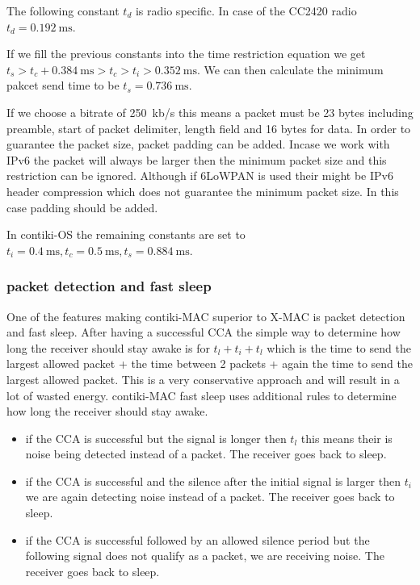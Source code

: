 The following constant $t_d$ is radio specific. In case of the CC2420 radio $t_d = 0.192~\text{ms}$.

If we fill the previous constants into the time restriction equation we get $t_s > t_c + 0.384~\text{ms} > t_c > t_i > 0.352~\text{ms}$. We can then calculate the minimum pakcet send time to be $t_s = 0.736~\text{ms}$.

If we choose a bitrate of 250~kb/s this means a packet must be 23 bytes including preamble, start of packet delimiter, length field and 16 bytes for data. In order to guarantee the packet size, packet padding can be added.
Incase we work with IPv6 the packet will always be larger then the minimum packet size and this restriction can be ignored. Although if 6LoWPAN is used their might be IPv6 header compression which does not guarantee the minimum packet size. In this case padding should be added.

In contiki-OS the remaining constants are set to $t_i = 0.4~\text{ms}, t_c = 0.5~\text{ms}, t_s = 0.884~\text{ms}$.

\subsubsection{packet detection and fast sleep}
One of the features making contiki-MAC superior to X-MAC is packet detection and fast sleep. After having a successful CCA the simple way to determine how long the receiver should stay awake is for $t_l + t_i + t_l$ which is the time to send the largest allowed packet + the time between 2 packets + again the time to send the largest allowed packet. This is a very conservative approach and will result in a lot of wasted energy. contiki-MAC fast sleep uses additional rules to determine how long the receiver should stay awake.
\begin{itemize}
    \item if the CCA is successful but the signal is longer then $t_l$ this means their is noise being detected instead of a packet. The receiver goes back to sleep.
    \item if the CCA is successful and the silence after the initial signal is larger then $t_i$ we are again detecting noise instead of a packet. The receiver goes back to sleep.
    \item if the CCA is successful followed by an allowed silence period but the following signal does not qualify as a packet, we are receiving noise. The receiver goes back to sleep.
\end{itemize} 

